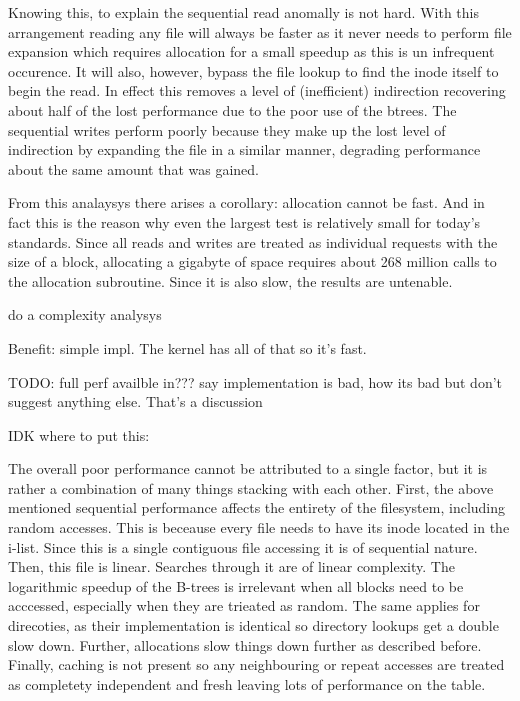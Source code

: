         Knowing this, to explain the sequential read anomally is not hard. With
        this arrangement reading any file will always be faster as it never
        needs to perform file expansion which requires allocation for a small
        speedup as this is un infrequent occurence. It will also, however,
        bypass the file lookup to find the inode itself to begin the read. In
        effect this removes a level of (inefficient) indirection recovering
        about half of the lost performance due to the poor use of the btrees.
        The sequential writes perform poorly because they make up the lost
        level of indirection by expanding the file in a similar manner,
        degrading performance about the same amount that was gained.

        From this analaysys there arises a corollary: allocation cannot be
        fast. And in fact this is the reason why even the largest test is
        relatively small for today's standards. Since all reads and writes are
        treated as individual requests with the size of a block, allocating a
        gigabyte of space requires about 268 million calls to the allocation
        subroutine. Since it is also slow, the results are untenable.

        do a complexity analysys

        Benefit: simple impl. The kernel has all of that so it's fast.


        TODO: full perf availble in???
        say implementation is bad, how its bad but don't suggest anything else. That's a discussion

        IDK where to put this:

        The overall poor performance cannot be attributed to a single factor,
        but it is rather a combination of many things stacking with each other.
        First, the above mentioned sequential performance affects the entirety
        of the filesystem, including random accesses. This is beceause every
        file needs to have its inode located in the i-list. Since this is a
        single contiguous file accessing it is of sequential nature. Then, this
        file is linear. Searches through it are of linear complexity. The
        logarithmic speedup of the B-trees is irrelevant when all blocks need
        to be acccessed, especially when they are trieated as random. The same
        applies for direcoties, as their implementation is identical so
        directory lookups get a double slow down. Further, allocations slow
        things down further as described before. Finally, caching is not
        present so any neighbouring or repeat accesses are treated as
        completety independent and fresh leaving lots of performance on the
        table.

